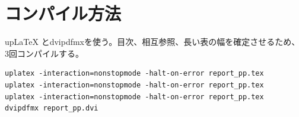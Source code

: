 \documentclass[uplatex,a4paper,11pt]{jsarticle}
\begin{document}
\appendix
\section{コンパイル方法}
up\LaTeX{} とdvipdfmxを使う。目次、相互参照、長い表の幅を確定させるため、3回コンパイルする。
\begin{lstlisting}
uplatex -interaction=nonstopmode -halt-on-error report_pp.tex
uplatex -interaction=nonstopmode -halt-on-error report_pp.tex
uplatex -interaction=nonstopmode -halt-on-error report_pp.tex
dvipdfmx report_pp.dvi
\end{lstlisting}
\end{document}
